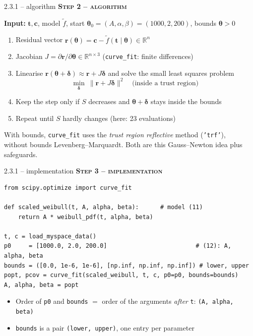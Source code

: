 \documentclass[aspectratio=169,11pt]{beamer}
\newcommand{\stage}[2]{{\color{#1}\bfseries\small\textsc{#2}}\par\smallskip}
\newcommand{\Algo}{\stage{algo}{Step 2 -- algorithm}}
\newcommand{\Impl}{\stage{impl}{Step 3 -- implementation}}
\begin{document}
\begin{frame}{2.3.1 -- algorithm}\footnotesize
\Algo
\textbf{Input:} $\bm t,\bm c$, model $\tilde f$, start $\bm\theta_0=(A,\alpha,\beta)=(1000,2,200)$, bounds $\bm\theta>0$
\begin{enumerate}
\item Residual vector $\bm r(\bm\theta)=\bm c-\tilde f(\bm t\mid\bm\theta)\in\mathbb R^{n}$
\item Jacobian $J=\partial\bm r/\partial\bm\theta\in\mathbb R^{n\times3}$ (\texttt{curve\_fit}: finite differences)
\item Linearise $\bm r(\bm\theta+\bm\delta)\approx\bm r+J\bm\delta$ and solve the small least squares problem
\[\min_{\bm\delta}\ \|\bm r+J\bm\delta\|^2 \quad\text{(inside a trust region)}\]
\item Keep the step only if $S$ decreases and $\bm\theta+\bm\delta$ stays inside the bounds
\item Repeat until $S$ hardly changes (here: 23 evaluations)
\end{enumerate}
With bounds, \texttt{curve\_fit} uses the \emph{trust region reflective} method (\texttt{'trf'}),\\
without bounds Levenberg--Marquardt. Both are this Gauss--Newton idea plus safeguards.
\end{frame}

\begin{frame}[fragile]{2.3.1 -- implementation}
\Impl
\begin{lstlisting}
from scipy.optimize import curve_fit

def scaled_weibull(t, A, alpha, beta):      # model (11)
    return A * weibull_pdf(t, alpha, beta)

t, c = load_myspace_data()
p0     = [1000.0, 2.0, 200.0]                         # (12): A, alpha, beta
bounds = ([0.0, 1e-6, 1e-6], [np.inf, np.inf, np.inf]) # lower, upper
popt, pcov = curve_fit(scaled_weibull, t, c, p0=p0, bounds=bounds)
A, alpha, beta = popt
\end{lstlisting}
\footnotesize
\begin{itemize}
\item Order of \texttt{p0} and \texttt{bounds} $=$ order of the arguments \emph{after} \texttt{t}: \texttt{(A, alpha, beta)}
\item \texttt{bounds} is a pair \texttt{(lower, upper)}, one entry per parameter
\end{itemize}
\end{frame}
\end{document}
